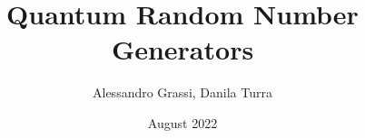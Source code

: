 \documentclass{report}
\title{Quantum Random Number Generators}
\author{Alessandro  Grassi, Danila Turra}
\date{August 2022}
\begin{document}
\nocite{*}



\tableofcontents
\listoffigures










\end{document}
